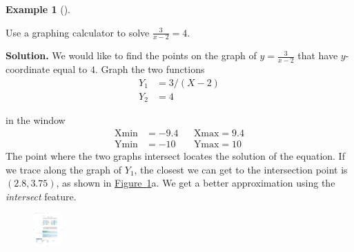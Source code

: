 \documentclass[10pt,]{book}
\theoremstyle{plain}
\theoremstyle{definition}
\theoremstyle{definition}
\theoremstyle{definition}
\newtheorem{example}[theorem]{Example}
\theoremstyle{definition}
\theoremstyle{definition}
\numberwithin{equation}{section}
\newcommand{\amp}{ & }
\begin{document}
\begin{example}[]\label{example-GC-nonlinear-equation}

        Use a graphing calculator to solve \(\frac{3}{x −2}= 4.\)
\par\medskip\noindent%
\textbf{Solution.}\quad 
    We would like to find the points on the graph of \(y = \frac{3}{x −2}\) that have \(y\)-coordinate equal to \(4\). Graph the two functions
    \begin{align}
    Y_1 \amp = 3/(X − 2)  \\
    Y_2 \amp = 4
    \end{align}

    in the window
    \begin{align}
    \text{Xmin} \amp = −9.4 \amp\amp \text{Xmax} = 9.4\\
    \text{Ymin} \amp = −10 \amp\amp \text{Ymax} = 10
    \end{align}
    The point where the two graphs intersect locates the solution of the equation. If we trace along the graph of \(Y_1\), the closest we can get to the intersection point is \((2.8, 3.75)\), as shown in \hyperref[fig-GC-nonlinear]{Figure~\ref{fig-GC-nonlinear}}a. We get a better approximation using the \emph{intersect} feature.
    \leavevmode%
\begin{figure}
\centering
\includegraphics[width=0.100\textwidth,]{images/fig-GC-nonlinear.pdf}\caption{\label{fig-GC-nonlinear}}
\end{figure}



\end{example}
\end{document}

